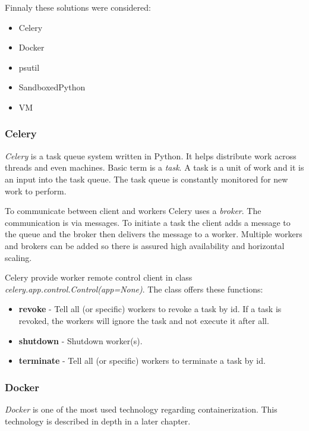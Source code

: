 \documentclass[12pt,a4paper]{article}
\begin{document}
\noindent
Finnaly these solutions were considered:
\begin{itemize}
\item Celery
\item Docker
\item psutil
\item SandboxedPython
\item VM
\end{itemize}

\subsubsection{Celery}
\textit{Celery} is a task queue system written in Python. It helps distribute work across threads and even machines. Basic term is
a \textit{task}. A task is a unit of work and it is an input into the task queue. The task queue is constantly monitored for new 
work to perform.

To communicate between client and workers Celery uses a \textit{broker}. The communication is via messages. To initiate a task the
client adds a message to the queue and the broker then delivers the message to a worker. Multiple workers and brokers can be added
so there is assured high availability and horizontal scaling.

Celery provide worker remote control client in class \textit{celery.app.control.Control(app=None)}. The class offers these functions:
\begin{itemize}
\item\textbf{revoke} - Tell all (or specific) workers to revoke a task by id. If a task is revoked, the workers will ignore the task and not execute it after all.
\item\textbf{shutdown} - Shutdown worker(s).
\item\textbf{terminate} - Tell all (or specific) workers to terminate a task by id.
\end{itemize}

\subsubsection{Docker}
\textit{Docker} is one of the most used technology regarding containerization. This technology is described in depth in a later chapter.
\end{document}
